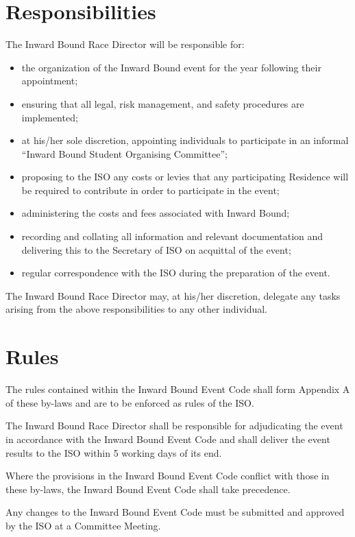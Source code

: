 \documentclass[12pt]{report}
\begin{document}
\section{Responsibilities}
The Inward Bound Race Director will be responsible for:
\begin{itemize}
\item the organization of the Inward Bound event for the year following their
appointment;
\item ensuring that all legal, risk management, and safety procedures are
implemented;
\item at his/her sole discretion, appointing individuals to participate in an
informal ``Inward Bound Student Organising Committee'';
\item proposing to the ISO any costs or levies that any participating Residence
will be required to contribute in order to participate in the event;
\item administering the costs and fees associated with Inward Bound;
\item recording and collating all information and relevant documentation and
delivering this to the Secretary of ISO on acquittal of the event;
\item regular correspondence with the ISO during the preparation of the event.
\end{itemize}
The Inward Bound Race Director may, at his/her discretion, delegate any tasks
arising from the above responsibilities to any other individual.

\section{Rules}
The rules contained within the Inward Bound Event Code shall form Appendix A
of these by-laws and are to be enforced as rules of the ISO.

The Inward Bound Race Director shall be responsible for adjudicating the event in
accordance with the Inward Bound Event Code and shall deliver the event results
to the ISO within 5 working days of its end.

Where the provisions in the Inward Bound Event Code conflict with those in these
by-laws, the Inward Bound Event Code shall take precedence.

Any changes to the Inward Bound Event Code must be submitted and approved by
the ISO at a Committee Meeting.
  \printindex
\end{document}
